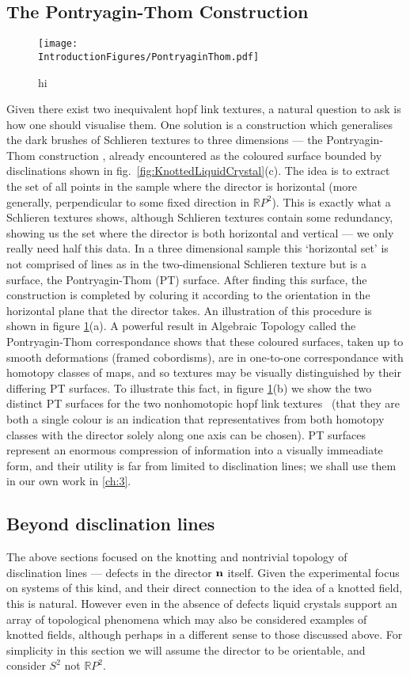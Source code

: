 \subsection{The Pontryagin-Thom Construction}
\begin{figure}[htbp]
\centering
\texttt{[image: \\IntroductionFigures/PontryaginThom.pdf]}
\caption{hi }
\label{fig:PT}
\end{figure}
Given there exist two inequivalent hopf link textures, a natural question to ask is how one should visualise them. One solution is a construction which generalises the dark brushes of Schlieren textures to three dimensions --- the Pontryagin-Thom construction \cite{ChenThesis, GarethBook,Machon, HopfFibrationExper}, already encountered as the coloured surface bounded by disclinations shown in fig.~\ref{fig:KnottedLiquidCrystal}(c). The idea is to extract the set of all points in the sample where the director is horizontal (more generally, perpendicular to some fixed direction in $\mathbb{R}P^2$).  This is exactly what a Schlieren textures shows, although Schlieren textures contain some redundancy, showing us the set where the director is both horizontal and vertical ---  we only really need half this data. In a three dimensional sample this `horizontal set' is not comprised of lines as in the two-dimensional Schlieren texture but is a surface, the Pontryagin-Thom (PT) surface. After finding this surface, the construction is completed by coluring it according to the orientation in the horizontal plane that the director takes. An illustration of this procedure is shown in figure \ref{fig:PT}(a). A powerful result in Algebraic Topology called the Pontryagin-Thom correspondance \cite{Milnor, Hatcher} shows that these coloured surfaces, taken up to smooth deformations (framed cobordisms), are in one-to-one correspondance with homotopy classes of maps, and so textures may be visually distinguished by their differing PT surfaces. To illustrate this fact, in figure \ref{fig:PT}(b) we show the two distinct  PT surfaces for the two nonhomotopic hopf link textures~\cite{Machon} (that they are both a single colour is an indication that representatives from both homotopy classes with the director solely along one axis can be chosen). PT surfaces represent an enormous compression of information into a visually immeadiate form, and their utility is far from limited to disclination lines; we shall use them in our own work in \ref{ch:3}.

\subsection{Beyond disclination lines}
The above sections focused on the knotting and nontrivial topology of disclination lines --- defects in the director $\bf n$ itself. Given the experimental focus on systems of this kind, and their direct connection to the idea of a knotted field, this is natural. However even in the absence of defects liquid crystals support an array of topological phenomena which may also be considered examples of knotted fields, although perhaps in a different sense to those discussed above. For simplicity in this section we will assume the director to be orientable, and consider $S^2$ not $\mathbb{R}P^2$.

